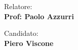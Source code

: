 \begin{titlepage}
\begin{center}
\end{center}
\vspace{30mm}

\begin{minipage}[t]{0.47\textwidth}
	{\large{Relatore:}{\normalsize\vspace{2mm}
	\\ \large{\textbf{Prof: Paolo Azzurri}} \normalsize}}
\end{minipage}
\hfill
\begin{minipage}[t]{0.47\textwidth}\raggedleft
	{\large{Candidato:}{\normalsize\vspace{2mm} \\ \large{\textbf{Piero Viscone}}}}
\end{minipage}

\vspace{35mm}
\hrulefill
\\




\end{titlepage}
\restoregeometry
